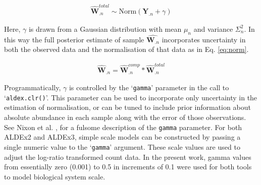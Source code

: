 \documentclass{article}
\begin{document}
\begin{eqnarray}
	\label{eq:adaptation}
	\hat{\mathbf{W}}^{total}_{.n} \sim \mathrm{Norm}(\mathbf{Y}_{.n} + \gamma)
\end{eqnarray}

Here, $\gamma$ is drawn from a Gaussian distribution with mean $\mu_n$ and variance $\Sigma^2_n$. In this way the full posterior estimate of sample  $\hat{\mathbf{W}_{.n}}$ incorporates uncertainty in both the observed data and the normalisation of that data as in Eq. \ref{eq:norm}.

\begin{eqnarray}
	\label{eq:norm}
	\hat{\mathbf{W}}_{.n} = \hat{\mathbf{W}}^{comp}_{.n} * \hat{\mathbf{W}}^{total}_{.n}
\end{eqnarray}


Programmatically, $\gamma$  is controlled by the `\texttt{gamma}' parameter in the call to `\texttt{aldex.clr()}'. This parameter can be used to incorporate only uncertainty in the estimation of normalisation, or can be tuned to include prior information about absolute abundance in each sample along with the error of those observations. See Nixon et al. \cite{nixon_incorporating_2025}, for a fulsome description of the \texttt{gamma} parameter. For both ALDEx2 and ALDEx3, simple scale models can be constructed by passing a single numeric value to the `\texttt{gamma}' argument. These scale values are used to adjust the log-ratio transformed count data. In the present work, gamma values from essentially zero (0.001) to 0.5 in increments of 0.1 were used for both tools to model biological system scale.


\end{document}

